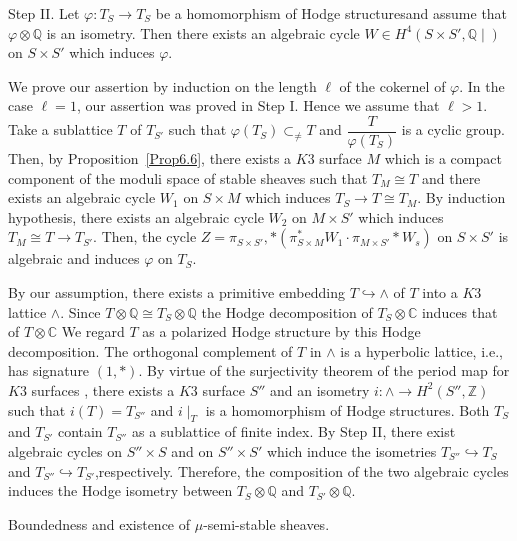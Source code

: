 Step II. Let $\varphi:T_S\to T_S$ be a homomorphism of Hodge
structures\pageoriginale and assume that $\varphi \otimes \mathbb{Q}$ is an
isometry. Then there exists an algebraic cycle $W\in H^{4}(S\times
S',\mathbb{Q}\mid)$ on $S\times S'$ which induces $\varphi$. 

\begin{Proof}
We prove our assertion by induction on the length $\ell$ of the
cokernel of $\varphi$. In the case $\ell=1$, our assertion was proved
in Step I. Hence we assume that $\ell>1$. Take a sublattice $T$ of
$T_{S'}$ such that $\varphi(T_S)\displaystyle\mathop{\subset}_{\neq} T$
and $\dfrac{T}{\varphi(T_S)}$ is a cyclic group. Then, by
Proposition~\ref{Prop6.6}, there exists a $K3$ surface $M$ which is a
compact component of the moduli space of stable sheaves such that
$T_M\cong T$ and there exists an algebraic cycle $W_1$ on $S\times M$
which induces $T_S\to T\cong T_M$. By induction hypothesis, there
exists an algebraic cycle $W_2$ on $M\times S'$ which induces
$T_M\cong T\to T_{S'}$. Then, the cycle $Z=\pi_{S\times
S'},\ast(\pi^{\ast}_{S\times M}W_1\cdot \pi_{M\times S'}\ast W_s)$ on
$S\times S'$ is algebraic and induces  $\varphi$ on $T_S$.
\enprf
\end{Proof}

\begin{pf3}
By our assumption, there exists a primitive embedding
$T\hookrightarrow \wedge$ of $T$ into a $K3$ lattice $\wedge$. Since
$T\otimes \mathbb{Q}\cong T_S\otimes \mathbb{Q}$ the Hodge decomposition of
$T_S\otimes \mathbb{C}$ induces that of $T\otimes \mathbb{C}$ We
regard $T$ as a polarized Hodge structure by this Hodge
decomposition. The orthogonal complement of $T$ in $\wedge$ is a
hyperbolic lattice, i.e., has signature $(1,\ast)$. By virtue of the
surjectivity theorem of the period map for $K3$ surfaces \cite{key23},
there exists a $K3$ surface $S''$ and an isometry $i:\wedge\to
H^{2}(S'',\mathbb{Z})$ such that $i(T)=T_{S''}$ and $i\mid_T$ is a
homomorphism of Hodge structures. Both $T_S$ and $T_{S'}$ contain
$T_{S''}$ as a sublattice of finite index. By Step II, there exist
algebraic cycles on $S''\times S$ and on $S''\times S'$ which induce
the isometries $T_{S''}\hookrightarrow T_S$ and
$T_{S''}\hookrightarrow T_{S'}$,\pageoriginale respectively. Therefore, the
composition of the two algebraic cycles induces the Hodge isometry
between $T_S\otimes \mathbb{Q}$ and $T_{S'}\otimes \mathbb{Q}$. 
\enprf
\end{pf3}

\begin{app}\label{app1}
Boundedness and existence of $\mu$-semi-stable sheaves.
\end{app}

